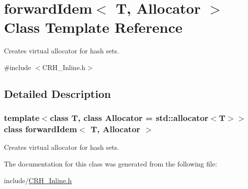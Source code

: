 \hypertarget{classforward_idem}{}\section{forward\+Idem$<$ T, Allocator $>$ Class Template Reference}
\label{classforward_idem}


Creates virtual allocator for hash sets.  




{\ttfamily \#include $<$C\+R\+H\+\_\+\+Inline.\+h$>$}



\subsection{Detailed Description}
\subsubsection*{template$<$class T, class Allocator = std\+::allocator$<$\+T$>$$>$class forward\+Idem$<$ T, Allocator $>$}

Creates virtual allocator for hash sets. 

The documentation for this class was generated from the following file\+:\begin{DoxyCompactItemize}
\item 
include/\hyperlink{_c_r_h___inline_8h}{C\+R\+H\+\_\+\+Inline.\+h}\end{DoxyCompactItemize}

